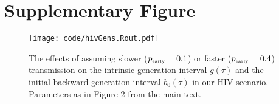 \documentclass[12pt]{article}
\newcommand{\tsub}[2]{#1_{{\textrm{\tiny #2}}}}
\newcommand{\pEarly}{\ensuremath{\tsub{p}{early}}}
\begin{document}
\pagebreak

\section{Supplementary Figure}

\begin{figure}[!ht]
\texttt{[image: code/hivGens.Rout.pdf]}
\caption{
The effects of assuming slower ($\pEarly=0.1$) or faster ($\pEarly=0.4$) transmission on the intrinsic generation interval $g(\tau)$ and the initial backward generation interval $b_0(\tau)$ in our HIV scenario. Parameters as in Figure 2 from the main text.
}
\end{figure}
\end{document}
